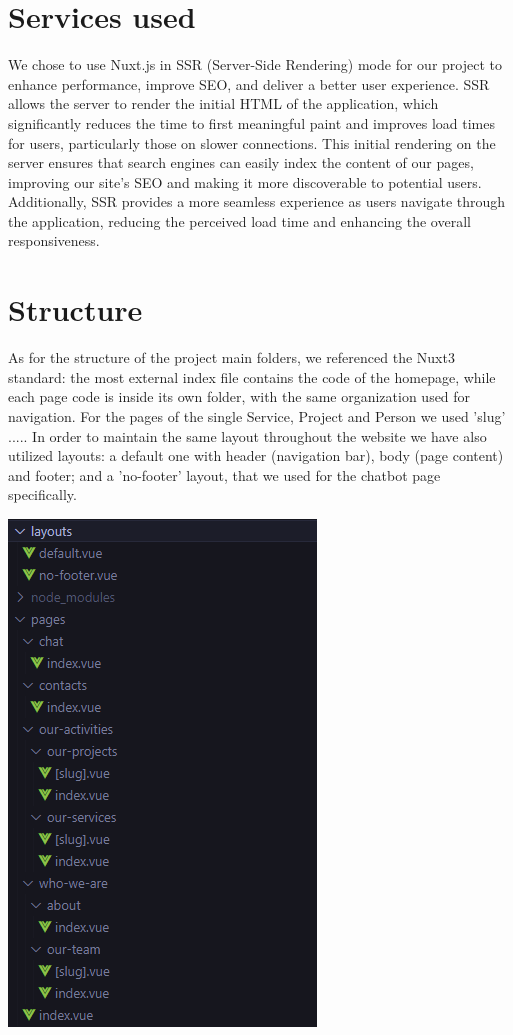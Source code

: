 \section{Services used}
We chose to use Nuxt.js in SSR (Server-Side Rendering) mode for our project to enhance performance, improve SEO, and deliver a better user experience.
SSR allows the server to render the initial HTML of the application, which significantly reduces the time to first meaningful paint and improves load times for users, particularly those on slower connections.
This initial rendering on the server ensures that search engines can easily index the content of our pages, improving our site's SEO and making it more discoverable to potential users.
Additionally, SSR provides a more seamless experience as users navigate through the application, reducing the perceived load time and enhancing the overall responsiveness.

\section{Structure}
As for the structure of the project main folders, we referenced the Nuxt3 standard: the most external index file
contains the code of the homepage, while each page code is inside its own folder, with the same organization used for navigation.
For the pages of the single Service, Project and Person we used 'slug' .....
In order to maintain the same layout throughout the website we have also utilized layouts: a default one with header (navigation bar), body (page content) and footer;
and a 'no-footer' layout, that we used for the chatbot page specifically.


\begin{center}
    \includegraphics[width=0.4\linewidth]{img/folders-structure.png}
\end{center}

